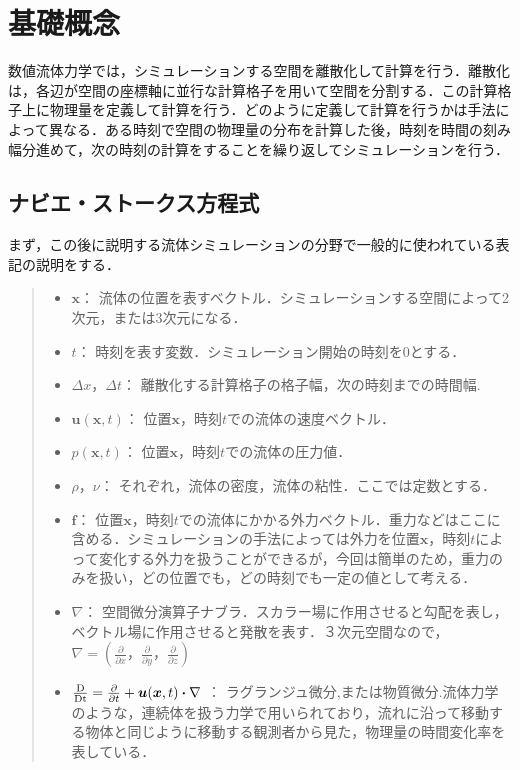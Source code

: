 \documentclass[a4j,12pt]{jreport}
\begin{document}
\section{基礎概念}
数値流体力学では，シミュレーションする空間を離散化して計算を行う．離散化は，各辺が空間の座標軸に並行な計算格子を用いて空間を分割する．この計算格子上に物理量を定義して計算を行う．どのように定義して計算を行うかは手法によって異なる．ある時刻で空間の物理量の分布を計算した後，時刻を時間の刻み幅分進めて，次の時刻の計算をすることを繰り返してシミュレーションを行う．
\subsection{ナビエ・ストークス方程式} \label{subsec:nabie}
まず，この後に説明する流体シミュレーションの分野で一般的に使われている表記の説明をする．
\begin{quote}
	\begin{itemize}
		\item $\bm{x}：$ 流体の位置を表すベクトル．シミュレーションする空間によって2次元，または3次元になる．
		\item $t：$ 時刻を表す変数．シミュレーション開始の時刻を$0$とする．
		\item $\varDelta x，\varDelta t：$ 離散化する計算格子の格子幅，次の時刻までの時間幅.
		\item $\bm{u} (\bm{x},t) ：$ 位置$\bm{x}$，時刻$t$での流体の速度ベクトル．
		\item $p (\bm{x},t) ：$ 位置$\bm{x}$，時刻$t$での流体の圧力値．
		\item $\rho，\nu：$ それぞれ，流体の密度，流体の粘性．ここでは定数とする．
		\item $\bm{f}：$ 位置$\bm{x}$，時刻$t$での流体にかかる外力ベクトル．重力などはここに含める．シミュレーションの手法によっては外力を位置$\bm{x}$，時刻$t$によって変化する外力を扱うことができるが，今回は簡単のため，重力のみを扱い，どの位置でも，どの時刻でも一定の値として考える．
		\item $\nabla：$ 空間微分演算子ナブラ．スカラー場に作用させると勾配を表し，ベクトル場に作用させると発散を表す．３次元空間なので，$\nabla=  (\frac{\partial}{\partial x}，\frac{\partial}{\partial y}，\frac{\partial}{\partial z}) $ 
		\item $\frac{\rm{D}}{\rm{D}t} =\frac{\partial}{\partial t} + \bm{u} (\bm{x},t)  \boldsymbol{\cdot}\nabla$ ：
		ラグランジュ微分,または物質微分.流体力学のような，連続体を扱う力学で用いられており，流れに沿って移動する物体と同じように移動する観測者から見た，物理量の時間変化率を表している．
	\end{itemize}
\end{quote}
\end{document}
